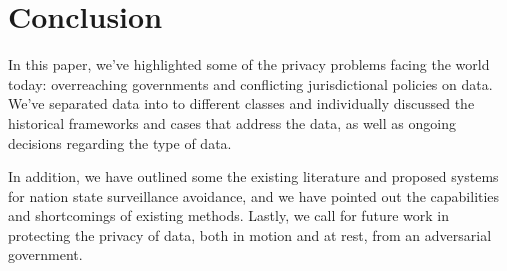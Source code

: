 \section{Conclusion}
\label{sec:conclusion}

In this paper, we've highlighted some of the privacy problems facing the world today: overreaching governments and conflicting jurisdictional policies on data.  We've separated data into to different classes and individually discussed the historical frameworks and cases that address the data, as well as ongoing decisions regarding the type of data. 

In addition, we have outlined some the existing literature and proposed systems for nation state surveillance avoidance, and we have pointed out the capabilities and shortcomings of existing methods.  Lastly, we call for future work in protecting the privacy of data, both in motion and at rest, from an adversarial government.
